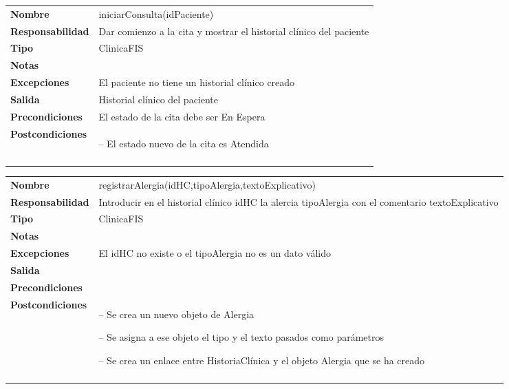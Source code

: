 \begin{table}[H]
\centering
	  \begin{tabularx}{\textwidth}{l|X}
    \textbf{Nombre}        & iniciarConsulta(idPaciente) \\ 
    \textbf{Responsabilidad}  & Dar comienzo a la cita y mostrar el historial clínico del paciente \\ 
    \textbf{Tipo}        &  ClinicaFIS\\ 
    \textbf{Notas}        &  \\ 
    \textbf{Excepciones}    & El paciente no tiene un historial clínico creado \\ 
    \textbf{Salida}        & Historial clínico del paciente \\ 
    \textbf{Precondiciones}    & El estado de la cita debe ser En Espera \\ 
    \textbf{Postcondiciones}  &  \begin{itemizenomargins}
   \item[--] El estado nuevo de la cita es Atendida
   \end{itemizenomargins} \\ \\
  \end{tabularx}

\end{table}


\begin{table}[H]
\centering
	  \begin{tabularx}{\textwidth}{l|X}
    \textbf{Nombre}        & registrarAlergia(idHC,tipoAlergia,textoExplicativo) \\ 
    \textbf{Responsabilidad}  & Introducir en el historial clínico idHC la alercia tipoAlergia con el comentario textoExplicativo \\ 
    \textbf{Tipo}        & ClinicaFIS \\ 
    \textbf{Notas}        &  \\ 
    \textbf{Excepciones}    & El idHC no existe o el tipoAlergia no es un dato válido \\ 
    \textbf{Salida}        &  \\ 
    \textbf{Precondiciones}    &  \\ 
    \textbf{Postcondiciones}  &  
    \begin{itemizenomargins}
   \item[--] Se crea un nuevo objeto de Alergia
   \item[--] Se asigna a ese objeto el tipo y el texto pasados como parámetros
   \item[--] Se crea un enlace entre HistoriaClínica y el objeto Alergia que se ha creado
   \end{itemizenomargins} \\ \\ 
  \end{tabularx}

\end{table}



